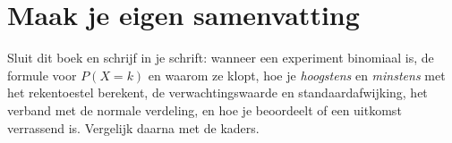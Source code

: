 
\begin{oefeningen}





\end{oefeningen}


\ifzelfstudie
\section*{Maak je eigen samenvatting}
Sluit dit boek en schrijf in je schrift: wanneer een experiment binomiaal is, de formule voor $P(X = k)$ en waarom ze klopt, hoe je \textit{hoogstens} en \textit{minstens} met het rekentoestel berekent, de verwachtingswaarde en standaardafwijking, het verband met de normale verdeling, en hoe je beoordeelt of een uitkomst verrassend is. Vergelijk daarna met de kaders.
\fi
